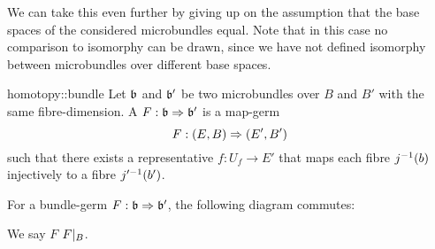 \begin{myparagraph}
    We can take this even further by giving up on the assumption that the base spaces of the considered microbundles equal.
    Note that in this case no comparison to isomorphy can be drawn,
    since we have not defined isomorphy between microbundles over different base spaces.
\end{myparagraph}

\begin{mydefinition}{homotopy::bundle}
    Let $\mathfrak{b}$ and $\mathfrak{b}'$ be two microbundles over $B$ and $B'$ with the same fibre-dimension.
    A  $F: \mathfrak{b} \Rightarrow{} \mathfrak{b}'$ is a map-germ
    \[ F: (E, B) \Rightarrow{} (E', B') \]
    such that there exists a representative $f: U_f \to E'$ that maps each fibre $j^{-1}(b)$ injectively to a fibre $j'^{-1}(b')$.
\end{mydefinition}

\begin{myparagraph}
    For a bundle-germ $F: \mathfrak{b} \Rightarrow{} \mathfrak{b}'$, the following diagram commutes:
    \begin{center}
    \end{center}
    We say $F$  $F\vert_{B}$.
\end{myparagraph}